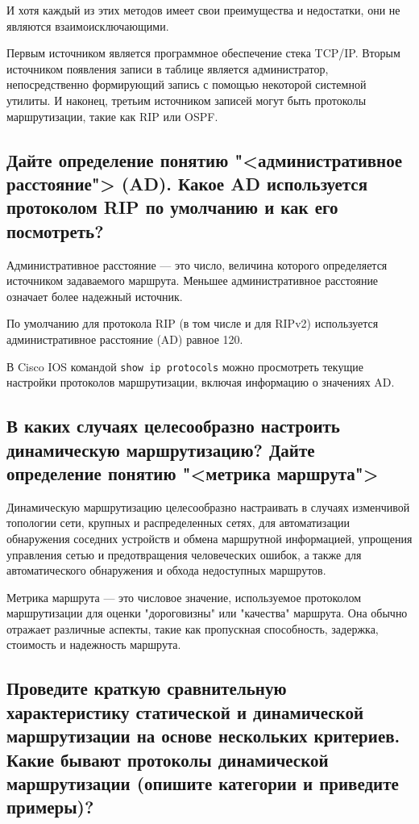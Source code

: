 И хотя каждый из этих методов имеет свои преимущества и недостатки,
они не являются взаимоисключающими.\par
Первым источником является программное обеспечение стека TCP/IP.
Вторым источником появления записи в таблице является администратор,
непосредственно формирующий запись с помощью некоторой системной утилиты.
И наконец, третьим источником записей могут быть протоколы маршрутизации,
такие как RIP или OSPF.

\subsection{Дайте определение понятию "<административное расстояние"> (AD).
	Какое AD используется протоколом RIP по умолчанию и как его посмотреть?}

Административное расстояние --- это число,
величина которого определяется источником задаваемого маршрута.
Меньшее административное расстояние означает более надежный источник.\par
По умолчанию для протокола RIP (в том числе и для RIPv2)
используется административное расстояние (AD) равное 120.\par
В Cisco IOS командой \texttt{show ip protocols} можно просмотреть
текущие настройки протоколов маршрутизации, включая информацию о значениях AD.

\subsection{В каких случаях целесообразно настроить динамическую маршрутизацию?
	Дайте определение понятию "<метрика маршрута">}

Динамическую маршрутизацию целесообразно настраивать
в случаях изменчивой топологии сети, крупных и распределенных сетях,
для автоматизации обнаружения соседних устройств
и обмена маршрутной информацией, упрощения управления сетью
и предотвращения человеческих ошибок,
а также для автоматического обнаружения и обхода недоступных маршрутов.\par
Метрика маршрута --- это числовое значение,
используемое протоколом маршрутизации для оценки "дороговизны"
или "качества" маршрута. Она обычно отражает различные аспекты,
такие как пропускная способность, задержка, стоимость и надежность маршрута.

\subsection{Проведите краткую сравнительную характеристику статической
	и динамической маршрутизации на основе нескольких критериев.
	Какие бывают протоколы динамической маршрутизации
	(опишите категории и приведите примеры)?}

